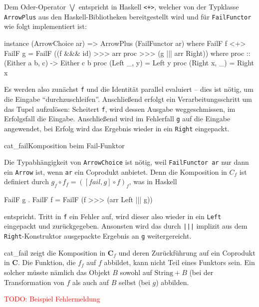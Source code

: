 \documentclass[11pt, a4paper, bibgerm]{scrbook}
\newenvironment{DIFnomarkup}{}{}
\newcommand\icode[1]{\lstinline?#1?}
\newcommand{\todo}[1]{
  \textcolor{red}{TODO: #1}
}
\newcommand\abb{}
\newcommand\fig{}
\begin{document}
Dem Oder-Operator $\bigvee$ entspricht in Haskell \icode{<+>}, welcher
von der Typklasse \icode{ArrowPlus} aus den Haskell-Bibliotheken
bereitgestellt wird und für \icode{FailFunctor} wie folgt implementiert
ist:

\begin{DIFnomarkup}\begin{code}
instance (ArrowChoice ar) => ArrowPlus (FailFunctor ar) where
  FailF f <+> FailF g = FailF ((f &&& id) >>> arr proc >>> (g ||| arr Right))
   where proc :: (Either a b, c) -> Either c b
         proc (Left  _, y) = Left y
         proc (Right x, _) = Right x
\end{code}\end{DIFnomarkup} %

Es werden also zunächst \icode{f} und die Identität parallel evaluiert --
dies ist nötig, um die Eingabe "`durchzuschleifen"'. Anschließend
erfolgt ein Verarbeitungsschritt um das Tupel aufzulösen: Scheitert
\icode{f}, wird dessen Ausgabe weggeschmissen, im Erfolgsfall die
Eingabe. Anschließend wird im Fehlerfall \icode{g} auf die Eingabe
angewendet, bei Erfolg wird das Ergebnis wieder in ein \icode{Right} eingepackt.

\fig{cat_fail}{Komposition beim Fail-Funktor}

Die Typabhängigkeit von \icode{ArrowChoice} ist nötig, weil
\icode{FailFunctor ar} nur dann ein \icode{Arrow} ist, wenn \icode{ar}
ein Coprodukt anbietet. Denn die Komposition in $C_{f}$ ist definiert
durch $g_{f} \circ f_{f} = ([fail,g] \circ f)_{f}$, was in Haskell
\begin{DIFnomarkup}\begin{code}
FailF g . FailF f = FailF (f >>> (arr Left ||| g))
\end{code}\end{DIFnomarkup} %
entspricht. Tritt in \icode{f} ein Fehler auf, wird dieser also wieder
in ein \icode{Left} eingepackt und zurückgegeben. Ansonsten wird das
durch \icode{|||} implizit aus dem \icode{Right}-Konstruktor ausgepackte
Ergebnis an \icode{g} weitergereicht.

\abb{cat_fail} zeigt die Komposition in $\mathbf{C}_f$ und deren
Zurückführung auf ein Coprodukt in $\mathbf{C}$. Die Funktion, die $f_f$
auf $f$ abbildet, kann nicht Teil eines Funktors sein. Ein solcher
müsste nämlich das Objekt $B$ sowohl auf $\mathrm{String}+B$ (bei der
Transformation von $f$ als auch auf $B$ selbst (bei $g$) abbilden.

\todo{Beispiel Fehlermeldung}
\end{document}
